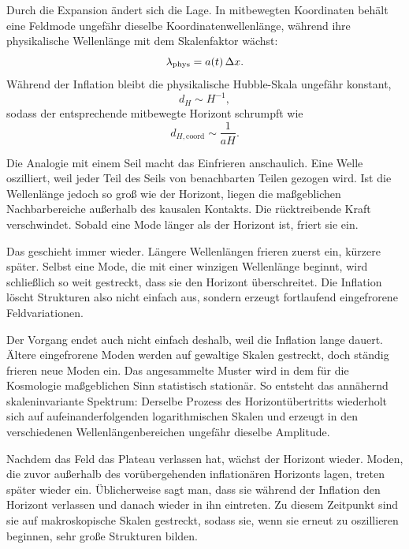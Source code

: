 Durch die Expansion ändert sich die Lage. In mitbewegten Koordinaten behält eine Feldmode ungefähr dieselbe Koordinatenwellenlänge, während ihre physikalische Wellenlänge mit dem Skalenfaktor wächst:
\begin{equation}
\lambda_{\rm phys}=a(t)\,\Delta x.
\end{equation}
Während der Inflation bleibt die physikalische Hubble-Skala ungefähr konstant,
\begin{equation}
d_H\sim H^{-1},
\end{equation}
sodass der entsprechende mitbewegte Horizont schrumpft wie
\begin{equation}
d_{H,\mathrm{coord}}\sim \frac{1}{aH}.
\end{equation}

Die Analogie mit einem Seil macht das Einfrieren anschaulich. Eine Welle oszilliert, weil jeder Teil des Seils von benachbarten Teilen gezogen wird. Ist die Wellenlänge jedoch so groß wie der Horizont, liegen die maßgeblichen Nachbarbereiche außerhalb des kausalen Kontakts. Die rücktreibende Kraft verschwindet. Sobald eine Mode länger als der Horizont ist, friert sie ein.

Das geschieht immer wieder. Längere Wellenlängen frieren zuerst ein, kürzere später. Selbst eine Mode, die mit einer winzigen Wellenlänge beginnt, wird schließlich so weit gestreckt, dass sie den Horizont überschreitet. Die Inflation löscht Strukturen also nicht einfach aus, sondern erzeugt fortlaufend eingefrorene Feldvariationen.

Der Vorgang endet auch nicht einfach deshalb, weil die Inflation lange dauert. Ältere eingefrorene Moden werden auf gewaltige Skalen gestreckt, doch ständig frieren neue Moden ein. Das angesammelte Muster wird in dem für die Kosmologie maßgeblichen Sinn statistisch stationär. So entsteht das annähernd skaleninvariante Spektrum: Derselbe Prozess des Horizontübertritts wiederholt sich auf aufeinanderfolgenden logarithmischen Skalen und erzeugt in den verschiedenen Wellenlängenbereichen ungefähr dieselbe Amplitude.

Nachdem das Feld das Plateau verlassen hat, wächst der Horizont wieder. Moden, die zuvor außerhalb des vorübergehenden inflationären Horizonts lagen, treten später wieder ein. Üblicherweise sagt man, dass sie während der Inflation den Horizont verlassen und danach wieder in ihn eintreten. Zu diesem Zeitpunkt sind sie auf makroskopische Skalen gestreckt, sodass sie, wenn sie erneut zu oszillieren beginnen, sehr große Strukturen bilden.

